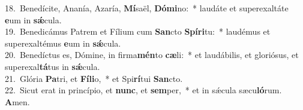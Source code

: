 {18.~}Benedícite, Ananía, Azaría, \textbf{Mí}saël, \textbf{Dó}\textbf{mi}no:~* laudáte et superexaltáte \textbf{e}um in \textbf{sǽ}cula.\\
{19.~}Benedicámus Patrem et Fílium cum \textbf{San}cto \textbf{Spí}\textbf{ri}tu:~* laudémus et superexaltémus \textbf{e}um in \textbf{sǽ}cula.\\
{20.~}Benedíctus es, Dómine, in firma\textbf{mén}to \textbf{cæ}li:~* et laudábilis, et gloriósus, et superexal\textbf{tá}tus in \textbf{sǽ}cula.\\
{21.~}Glória \textbf{Pa}tri, et \textbf{Fí}\textbf{li}o,~* et Spi\textbf{rí}tui \textbf{San}cto.\\
{22.~}Sicut erat in princípio, et \textbf{nunc}, et \textbf{sem}per,~* et in sǽcula sæcu\textbf{ló}rum. \textbf{A}men.\\
